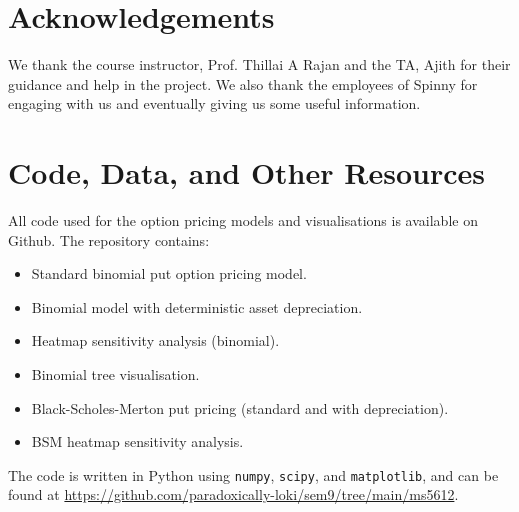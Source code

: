 \documentclass[11pt, a4paper]{article}
\begin{document}
\section{Acknowledgements}

We thank the course instructor, Prof. Thillai A Rajan and the TA, Ajith for their guidance and help in the project. We also thank the employees of Spinny for engaging with us and eventually giving us some useful information.


\section{Code, Data, and Other Resources}

All code used for the option pricing models and visualisations is available on Github. The repository contains:

\begin{itemize}
    \item Standard binomial put option pricing model.
    \item Binomial model with deterministic asset depreciation.
    \item Heatmap sensitivity analysis (binomial).
    \item Binomial tree visualisation.
    \item Black-Scholes-Merton put pricing (standard and with depreciation).
    \item BSM heatmap sensitivity analysis.
\end{itemize}

The code is written in Python using \texttt{numpy}, \texttt{scipy}, and \texttt{matplotlib}, and can be found at \url{https://github.com/paradoxically-loki/sem9/tree/main/ms5612}.
\end{document}
